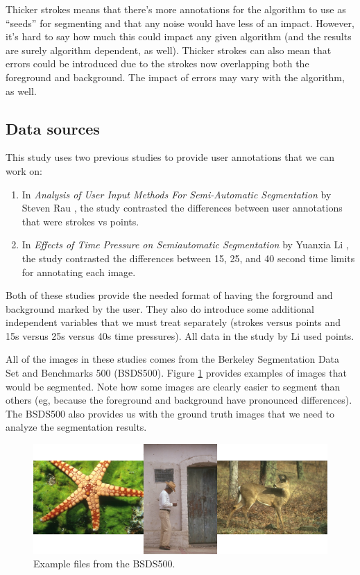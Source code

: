 \documentclass[12pt,a4paper,notitlepage]{article}
\begin{document}
Thicker strokes means that there's more annotations for the algorithm to use as ``seeds'' for segmenting and that any noise would have less of an impact. However, it's hard to say how much this could impact any given algorithm (and the results are surely algorithm dependent, as well). Thicker strokes can also mean that errors could be introduced due to the strokes now overlapping both the foreground and background. The impact of errors may vary with the algorithm, as well.

\subsection{Data sources}
This study uses two previous studies to provide user annotations that we can work on:

\begin{enumerate}
	\item In \textit{Analysis of User Input Methods For Semi-Automatic Segmentation} by Steven Rau \cite{rau}, the study contrasted the differences between user annotations that were strokes vs points.
	\item In \textit{Effects of Time Pressure on Semiautomatic Segmentation} by Yuanxia Li \cite{yuanxia}, the study contrasted the differences between 15, 25, and 40 second time limits for annotating each image.
\end{enumerate}

Both of these studies provide the needed format of having the forground and background marked by the user. They also do introduce some additional independent variables that we must treat separately (strokes versus points and 15s versus 25s versus 40s time pressures). All data in the study by Li used points.

All of the images in these studies comes from the Berkeley Segmentation Data Set and Benchmarks 500 \cite{bsds500} (BSDS500). Figure \ref{fig:bsds500_samples} provides examples of images that would be segmented. Note how some images are clearly easier to segment than others (eg, because the foreground and background have pronounced differences). The BSDS500 also provides us with the ground truth images that we need to analyze the segmentation results.

\begin{figure}[h]
	\includegraphics[width=\linewidth]{bsds500_samples}
	\caption{Example files from the BSDS500.}
	\label{fig:bsds500_samples}
\end{figure}
\end{document}
